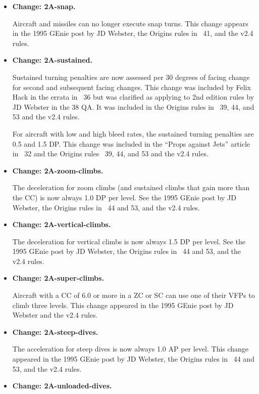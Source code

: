 \documentclass{report}
\newcommand{\changetag}[1]{\textbf{Change: #1.}\par}
\begin{document}
\begin{itemize}
    \item\changetag{2A-snap}

        Aircraft and missiles can no longer execute snap turns. This change appears in the 1995 GEnie post by JD Webster, the Origins rules in {\APJ}~41, and the v2.4 rules.

    \item\changetag{2A-sustained}

        Sustained turning penalties are now assessed per 30 degrees of facing change for second and subsequent facing changes. This change was included by Felix Hack in the errata in {\APJ}~36 but was clarified as applying to 2nd edition rules by JD Webster in the {\APJ} 38 QA. It was included in the Origins rules in {\APJ}~39, 44, and 53 and the v2.4 rules.

        For aircraft with low and high bleed rates, the sustained turning penalties are 0.5 and 1.5 DP. This change was included in the “Props against Jets” article in {\APJ}~32 and the Origins rules {\APJ}~39, 44, and 53 and the v2.4 rules.

    \item\changetag{2A-zoom-climbs}

        The deceleration for zoom climbs (and sustained climbs that gain more than the CC) is now always 1.0 DP per level. See the 1995 GEnie post by JD Webster, the Origins rules {in \APJ}~44 and 53, and the v2.4 rules.

    \item\changetag{2A-vertical-climbs}

        The deceleration for vertical climbs is now always 1.5 DP per level. See the 1995 GEnie post by JD Webster, the Origins rules {in \APJ}~44 and 53, and the v2.4 rules.

    \item\changetag{2A-super-climbs}

        Aircraft with a CC of 6.0 or more in a ZC or SC can use one of their VFPs to climb three levels. This change appeared in the 1995 GEnie post by JD Webster and the v2.4 rules.

    \item\changetag{2A-steep-dives}

        The acceleration for steep dives is now always 1.0 AP per level. This change appeared in the 1995 GEnie post by JD Webster, the Origins rules in {\APJ}~44 and 53, and the v2.4 rules.

    \item\changetag{2A-unloaded-dives}


\end{itemize}
\end{document}
